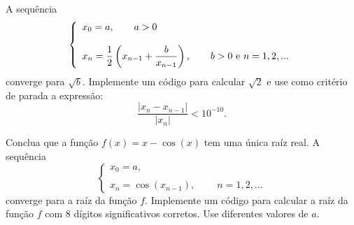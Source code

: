 \begin{exer}
A sequência
$$\left\{
\begin{array}{l}\displaystyle
 x_0=a,\qquad a>0\\\\ \displaystyle
 x_{n}=\frac{1}{2}\left(x_{n-1}+\frac{b}{x_{n-1}}\right),\qquad b>0\ \hbox{e}\ n=1,2,...
\end{array}\right.
$$
converge para $\sqrt{b}$. Implemente um código para calcular $\sqrt{2}$ e use como critério de parada a expressão:
$$
\frac{|x_n-x_{n-1}|}{|x_n|}<10^{-10}.
$$
\end{exer}
\begin{exer}\label{exerc4.2}
Conclua que a função  $f(x)=x-\cos(x)$ tem uma única raíz real. A sequência
$$\left\{
\begin{array}{l}\displaystyle
 x_0=a, \\\\ \displaystyle
 x_{n}=\cos(x_{n-1}),\qquad\ n=1,2,...
\end{array}\right.
$$
converge para a raíz da função $f$. Implemente um código para calcular a raíz da função $f$ com 8 dígitos significativos corretos. Use diferentes valores de $a$.
\end{exer}